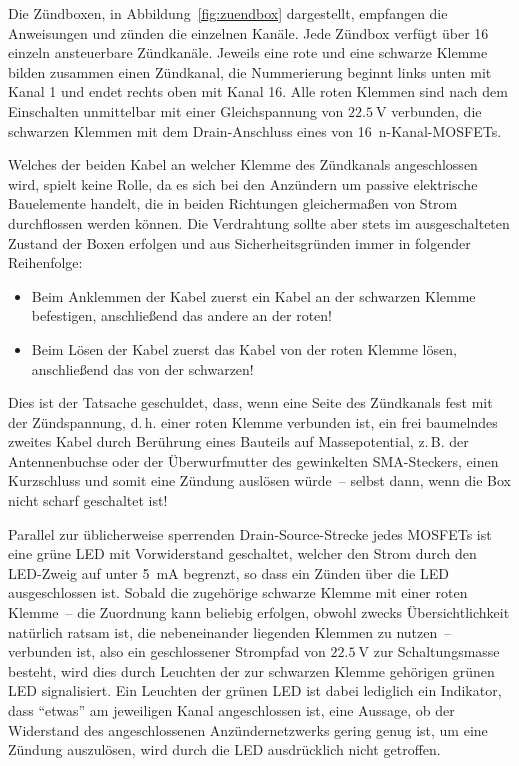 \documentclass[paper=a4, parskip, numbers=noenddot, toc=listof, headsepline]{scrbook}
\begin{document}
			Die Zündboxen, in Abbildung~\ref{fig:zuendbox} dargestellt, empfangen die Anweisungen und zünden die einzelnen Kanäle. Jede Zündbox verfügt über 16 einzeln ansteuerbare Zündkanäle. Jeweils eine rote und eine schwarze Klemme bilden zusammen einen Zündkanal, die Nummerierung beginnt links unten mit Kanal 1 und endet rechts oben mit Kanal 16. Alle roten Klemmen sind nach dem Einschalten unmittelbar mit einer Gleichspannung von $\SI{22,5}{\volt}$ verbunden, die schwarzen Klemmen mit dem Drain-Anschluss eines von 16~n-Kanal-MOSFETs.

			Welches der beiden Kabel an welcher Klemme des Zündkanals angeschlossen wird, spielt keine Rolle, da es sich bei den Anzündern um passive elektrische Bauelemente handelt, die in beiden Richtungen gleichermaßen von Strom durchflossen werden können. Die Verdrahtung sollte aber stets im ausgeschalteten Zustand der Boxen erfolgen und aus Sicherheitsgründen immer in folgender Reihenfolge:
			\begin{itemize}
				\item Beim Anklemmen der Kabel zuerst ein Kabel an der schwarzen Klemme befestigen, anschließend das andere an der roten!
				\item Beim Lösen der Kabel zuerst das Kabel von der roten Klemme lösen, anschließend das von der schwarzen!
			\end{itemize}
			Dies ist der Tatsache geschuldet, dass, wenn eine Seite des Zündkanals fest mit der Zündspannung, d.\,h. einer roten Klemme verbunden ist, ein frei baumelndes zweites Kabel durch Berührung eines Bauteils auf Massepotential, z.\,B. der Antennenbuchse oder der Überwurfmutter des gewinkelten SMA-Steckers, einen Kurzschluss und somit eine Zündung auslösen würde~-- selbst dann, wenn die Box nicht scharf geschaltet ist!

			Parallel zur üblicherweise sperrenden Drain-Source-Strecke jedes MOSFETs ist eine grüne LED mit Vorwiderstand geschaltet, welcher den Strom durch den LED-Zweig auf unter \SI{5}{\milli\ampere} begrenzt, so dass ein Zünden über die LED ausgeschlossen ist. Sobald die zugehörige schwarze Klemme mit einer roten Klemme~-- die Zuordnung kann beliebig erfolgen, obwohl zwecks Übersichtlichkeit natürlich ratsam ist, die nebeneinander liegenden Klemmen zu nutzen~-- verbunden ist, also ein geschlossener Strompfad von $\SI{22,5}{\volt}$ zur Schaltungsmasse besteht, wird dies durch Leuchten der zur schwarzen Klemme gehörigen grünen LED signalisiert. Ein Leuchten der grünen LED ist dabei lediglich ein Indikator, dass \enquote{etwas} am jeweiligen Kanal angeschlossen ist, eine Aussage, ob der Widerstand des angeschlossenen Anzündernetzwerks gering genug ist, um eine Zündung auszulösen, wird durch die LED ausdrücklich nicht getroffen.
\end{document}
